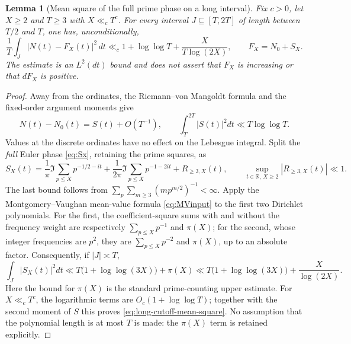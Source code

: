 \documentclass[11pt,reqno]{amsart}
\numberwithin{equation}{section}
\newtheorem{lemma}[theorem]{Lemma}
\newcommand{\R}{\mathbb R}
\begin{document}
\begin{lemma}[Mean square of the full prime phase on a long interval]
\label{lem:long-cutoff-mean-square}
Fix $c>0$, let $X\ge2$ and $T\ge3$ with $X\ll_c T^c$.
For every interval $J\subseteq[T,2T]$ of length between
$T/2$ and $T$, one has, unconditionally,
\begin{equation}\label{eq:long-cutoff-mean-square}
 \frac1T\int_J|N(t)-F_X(t)|^2\,dt
 \ll_c 1+\log\log T+\frac{X}{T\log(2X)},
 \qquad F_X=N_0+S_X.
\end{equation}
The estimate is an $L^2(dt)$ bound and does not assert that
$F_X$ is increasing or that $dF_X$ is positive.
\end{lemma}
\begin{proof}
Away from the ordinates, the Riemann--von Mangoldt formula
and the fixed-order argument moments give
\[
 N(t)-N_0(t)=S(t)+O(T^{-1}),\qquad
 \int_T^{2T}|S(t)|^2dt\ll T\log\log T.
\]
Values at the discrete ordinates have no effect on the
Lebesgue integral.  Split the \emph{full} Euler phase
\eqref{eq:Sx}, retaining the prime squares, as
\[
 S_X(t)=\frac1\pi\Im\sum_{p\le X}p^{-1/2-it}
       +\frac1{2\pi}\Im\sum_{p\le X}p^{-1-2it}
       +R_{\ge3,X}(t),\qquad
 \sup_{t\in\R,\,X\ge2}|R_{\ge3,X}(t)|\ll1.
\]
The last bound follows from
$\sum_p\sum_{m\ge3}(mp^{m/2})^{-1}<\infty$.
Apply the Montgomery--Vaughan mean-value formula
\eqref{eq:MVinput} to the first two Dirichlet polynomials.
For the first, the coefficient-square sums with and
without the frequency weight are respectively
$\sum_{p\le X}p^{-1}$ and $\pi(X)$; for the second,
whose integer frequencies are $p^2$, they are
$\sum_{p\le X}p^{-2}$ and $\pi(X)$, up to an absolute
factor. Consequently, if $|J|\asymp T$,
\[
 \int_J |S_X(t)|^2dt\ll
 T\bigl(1+\log\log(3X)\bigr)+\pi(X)
 \ll T\bigl(1+\log\log(3X)\bigr)
      +\frac{X}{\log(2X)}.
\]
Here the bound for $\pi(X)$ is the standard prime-counting
upper estimate. For $X\ll_c T^c$, the logarithmic terms are
$O_c(1+\log\log T)$; together with the second moment of $S$
this proves \eqref{eq:long-cutoff-mean-square}. No assumption
that the polynomial length is at most $T$ is made: the
$\pi(X)$ term is retained explicitly.
\end{proof}
\end{document}
